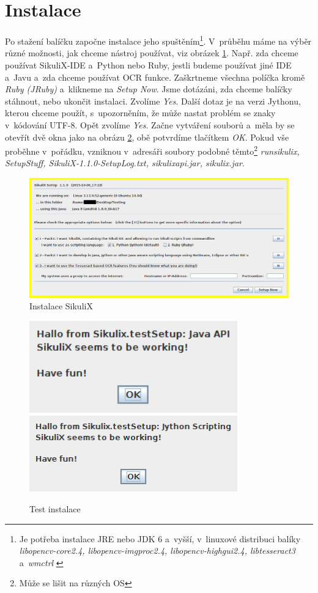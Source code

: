 \documentclass{bakalarka}
\begin{document}
	\section{Instalace}
	Po stažení balíčku započne instalace jeho spuštěním\footnote{Je potřeba instalace JRE nebo JDK 6 a~vyšší, v~linuxové distribuci balíky \emph{libopencv-core2.4, libopencv-imgproc2.4, libopencv-highgui2.4, libtesseract3} a~\emph{wmctrl} \cite{SikuliX}}. V~průběhu máme na výběr různé možnosti, jak chceme nástroj používat, viz obrázek \ref{Instal}. Např. zda chceme používat SikuliX-IDE a~Python nebo Ruby, jestli budeme používat jiné IDE a~Javu a~zda chceme používat OCR funkce. Zaškrtneme všechna políčka kromě \emph{Ruby (JRuby)} a~klikneme na \emph{Setup Now}. Jsme dotázáni, zda chceme balíčky stáhnout, nebo ukončit instalaci. Zvolíme \emph{Yes}. Další dotaz je na verzi Jythonu, kterou chceme použít, s~upozorněním, že může nastat problém se znaky v~kódování UTF-8. Opět zvolíme \emph{Yes}. Začne vytváření souborů a~měla by se otevřít dvě okna jako na obrázu \ref{InstalOK}, obě potvrdíme tlačítkem \emph{OK}. Pokud vše proběhne v~pořádku, vzniknou v~adresáři soubory podobné těmto\footnote{Může se lišit na různých OS} \emph{runsikulix, SetupStuff, SikuliX-1.1.0-SetupLog.txt, sikulixapi.jar, sikulix.jar}.
	\begin{figure}[ht]
		\centering
		\caption{Instalace SikuliX}
		\label{Instal}
		\includegraphics[width=14cm]{img/Instalace/Instalace.png}
	\end{figure}
	\begin{figure}[ht]
		\centering
		\caption{Test instalace}
		\label{InstalOK}
		\includegraphics[width=9cm]{img/Instalace/InstalaceOK.png}\\[0.3cm]
		\includegraphics[width=9cm]{img/Instalace/InstalaceOK1.png}
	\end{figure}
	
\end{document}
